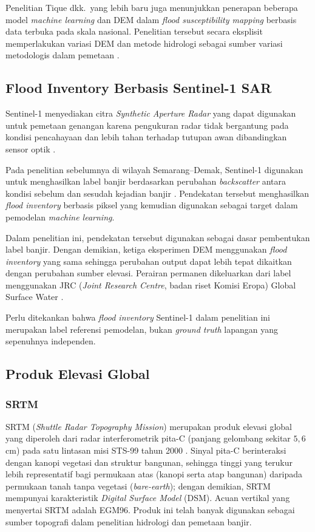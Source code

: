 \documentclass[12pt]{article}
\begin{document}
Penelitian Tique dkk.\ yang lebih baru juga menunjukkan penerapan beberapa
model
\textit{machine learning} dan DEM dalam \textit{flood susceptibility mapping}
berbasis data terbuka pada skala nasional. Penelitian tersebut secara
eksplisit memperlakukan variasi DEM dan metode hidrologi sebagai sumber
variasi metodologis dalam pemetaan \cite{Tique2026}.

\subsection{Flood Inventory Berbasis Sentinel-1 SAR}

Sentinel-1 menyediakan citra \textit{Synthetic Aperture Radar} yang dapat
digunakan untuk pemetaan genangan karena pengukuran radar tidak bergantung
pada kondisi pencahayaan dan lebih tahan terhadap tutupan awan dibandingkan
sensor optik \cite{islammeng2022,unspider2024}.

Pada penelitian sebelumnya di wilayah Semarang--Demak, Sentinel-1 digunakan
untuk menghasilkan label banjir berdasarkan perubahan \textit{backscatter}
antara kondisi sebelum dan sesudah kejadian banjir \cite{hakim2026}.
Pendekatan tersebut menghasilkan \textit{flood inventory} berbasis piksel
yang kemudian digunakan sebagai target dalam pemodelan \textit{machine
learning}.

Dalam penelitian ini, pendekatan tersebut digunakan sebagai dasar pembentukan
label banjir. Dengan demikian, ketiga eksperimen DEM menggunakan
\textit{flood inventory} yang sama sehingga perubahan output dapat lebih
tepat dikaitkan dengan perubahan sumber elevasi. Perairan permanen
dikeluarkan dari label menggunakan JRC (\textit{Joint Research Centre},
badan riset Komisi Eropa) Global Surface Water \cite{pekel2016}.

Perlu ditekankan bahwa \textit{flood inventory} Sentinel-1 dalam penelitian
ini merupakan label referensi pemodelan, bukan \textit{ground truth}
lapangan yang sepenuhnya independen.

\subsection{Produk Elevasi Global}

\subsubsection{SRTM}

SRTM (\textit{Shuttle Radar Topography Mission}) merupakan produk elevasi
global yang diperoleh dari radar interferometrik pita-C (panjang gelombang
sekitar $5{,}6$ cm) pada satu lintasan misi STS-99 tahun 2000
\cite{farr2007}. Sinyal pita-C berinteraksi dengan kanopi vegetasi dan
struktur bangunan, sehingga tinggi yang terukur lebih representatif bagi
permukaan atas (kanopi serta atap bangunan) daripada permukaan tanah tanpa
vegetasi (\textit{bare-earth}); dengan demikian, SRTM mempunyai
karakteristik \textit{Digital Surface Model} (DSM).
Acuan vertikal yang menyertai SRTM adalah EGM96. Produk ini telah banyak
digunakan sebagai sumber topografi dalam penelitian
hidrologi dan pemetaan banjir.
\end{document}
